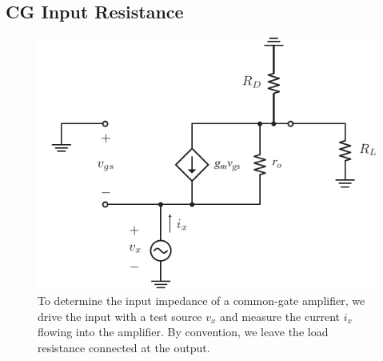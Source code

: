\subsection{CG Input Resistance}

\begin{figure}[tb]
\begin{center}
\includegraphics[scale=.9]{cgamp_is_ac_ss_zin}
\end{center}
\caption{To determine the input impedance of a common-gate amplifier, we drive the input with a test source $v_x$ and measure the current $i_x$ flowing into the amplifier.  By convention, we leave the load resistance connected at the output.} \label{fig:cgamp_is_ac_ss_zin}
\end{figure}

